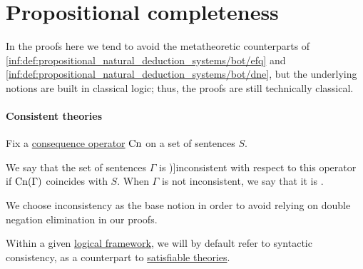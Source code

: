 \section{Propositional completeness}\label{sec:propositional_completeness}

\begin{remark}\label{rem:classical_metatheoretic_proofs}
  In the proofs here we tend to avoid the metatheoretic counterparts of \ref{inf:def:propositional_natural_deduction_systems/bot/efq} and \ref{inf:def:propositional_natural_deduction_systems/bot/dne}, but the underlying notions are built in classical logic; thus, the proofs are still technically classical.
\end{remark}

\paragraph{Consistent theories}

\begin{definition}\label{def:consistent_set_of_sentences}
  Fix a \hyperref[def:consequence_operator]{consequence operator} \( \op{Cn} \) on a set of sentences \( S \).

  We say that the set of sentences \( \Gamma \) is \term[ru=противоречивое (множество формул) (\cite[def. 1.3.15]{Герасимов2011Вычислимость})]{inconsistent} with respect to this operator if \( \op{Cn}(\Gamma) \) coincides with \( S \). When \( \Gamma \) is not inconsistent, we say that it is .
\end{definition}
\begin{comments}
  \item We choose inconsistency as the base notion in order to avoid relying on double negation elimination in our proofs.
  \item Within a given \hyperref[def:logical_framework]{logical framework}, we will by default refer to syntactic consistency, as a counterpart to \hyperref[def:satisfiable_set_of_sentences]{satisfiable theories}.
\end{comments}

